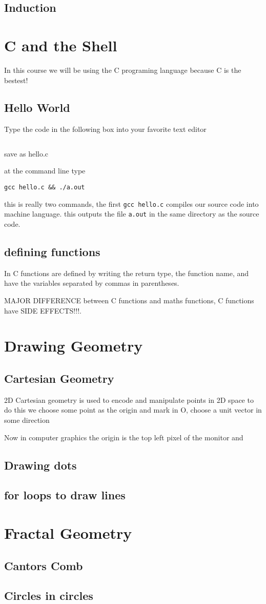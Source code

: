 \documentclass[12pt]{article}
\begin{document}
\subsection{Induction}

\section{C and the Shell}
    In this course we will be using the C programing language because C is the bestest!
\subsection{Hello World}
    Type the code in the following box into your favorite text editor
\inputminted{c}{hello.c}
    save as hello.c

    at the command line type

    \texttt{gcc hello.c \&\& ./a.out}

    this is really two commands, the first \texttt{gcc hello.c} compiles our source code into
    machine language. this outputs the file \texttt{a.out} in the same directory as the 
    source code.
\subsection{defining functions}
    In C functions are defined by writing the return type, the function name, and have 
    the variables separated by commas in parentheses.

    MAJOR DIFFERENCE between C functions and maths functions, C functions have SIDE EFFECTS!!!.

\section{Drawing Geometry}
\subsection{Cartesian Geometry}
    2D Cartesian geometry is used to encode and manipulate points in 2D space
    to do this we choose some point as the origin and mark in O, choose a unit 
    vector in some direction 

    Now in computer graphics the origin is the top left pixel of the monitor 
    and 
\subsection{Drawing dots}
\subsection{for loops to draw lines}

\section{Fractal Geometry}
\subsection{Cantors Comb}
\subsection{Circles in circles}
\end{document}
